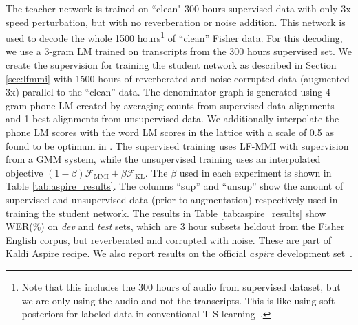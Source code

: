 \documentclass{article}
\newcommand{\Fkl}{\mathcal{F}_\text{KL}}
\newcommand{\Fmmi}{\mathcal{F}_\text{MMI}}
\begin{document}
The teacher network is trained on ``clean" 300 hours supervised data with 
only 3x speed perturbation, but with no reverberation or noise addition.
This network is used to decode the whole 1500 
hours\footnote{Note that this includes the 300 hours of 
audio from supervised dataset, but we are only using the audio and not the 
transcripts. This is like using soft posteriors for labeled data in
conventional T-S learning~\cite{hinton2015distilling}.} 
of ``clean''
Fisher data. For this decoding, we use a 3-gram LM
trained on transcripts from the 300 hours supervised set.
We create the supervision for training the student network as described 
in Section \ref{sec:lfmmi} with 1500 hours of reverberated and noise corrupted
data (augmented 3x) parallel to the ``clean'' data. 
The denominator graph is generated using 4-gram phone LM created by averaging 
counts from supervised data alignments and 1-best alignments from
unsupervised data. We additionally interpolate the phone LM scores with the 
word LM scores in the lattice with a scale of 0.5 as found to be 
optimum in \cite{manohar2018semisup}.
% 
% 
The supervised training uses LF-MMI with supervision from a GMM system, while 
the unsupervised training uses an interpolated objective
$(1-\beta)\Fmmi+\beta\Fkl$. The $\beta$ used in each experiment is shown in 
Table \ref{tab:aspire_results}.
The columns ``sup'' and ``unsup'' show the amount of supervised and unsupervised 
data (prior to augmentation) respectively used in training the student network. 
The results in Table \ref{tab:aspire_results} show WER(\%) on 
{\em dev} and {\em test} sets, which are 3 hour subsets heldout from the 
Fisher English corpus, but reverberated and corrupted with noise. 
These are part of Kaldi \cite{kaldi_paper} Aspire recipe. We also report results 
on the official {\em aspire} development set~\cite{aspire}. 
\end{document}
